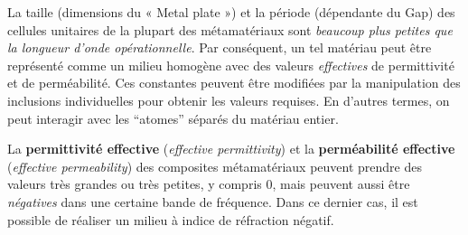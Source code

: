 \begin{prop}[Homogénéisation]
  La taille (dimensions du « Metal plate ») et la période (dépendante du Gap)
  des cellules unitaires de la plupart des métamatériaux sont \emph{beaucoup
  plus petites que la longueur d'onde opérationnelle}. Par conséquent, un tel
  matériau peut être représenté comme un milieu homogène avec des valeurs
  \emph{effectives} de permittivité et de perméabilité. Ces constantes peuvent
  être modifiées par la manipulation des inclusions individuelles pour obtenir
  les valeurs requises. En d'autres termes, on peut interagir avec les
  ``atomes'' séparés du matériau entier.
\end{prop}

La \textbf{permittivité effective} (\textit{effective permittivity}) et la
\textbf{perméabilité effective} (\textit{effective permeability}) des
composites métamatériaux peuvent prendre des valeurs très grandes ou très
petites, y compris $0$, mais peuvent aussi être \emph{négatives} dans une
certaine bande de fréquence. Dans ce dernier cas, il est possible de réaliser
un milieu à indice de réfraction négatif.

